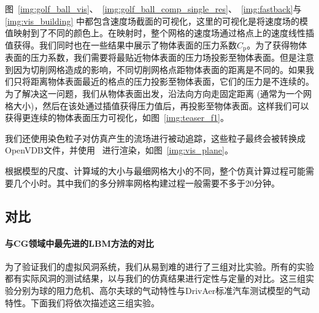 图~\ref{img:golf_ball_vis}、~\ref{img:golf_ball_comp_single_res}、~\ref{img:fastback}与\ref{img:vis_building} 中都包含速度场截面的可视化，这里的可视化是将速度场的模值映射到了不同的颜色上。在映射时，整个网格的速度场通过格点上的速度线性插值获得。我们同时也在一些结果中展示了物体表面的压力系数$C_\text{p}$。为了获得物体表面的压力系数，我们需要将最贴近物体表面的压力场投影至物体表面。但是注意到因为切削网格造成的影响，不同切削网格点距物体表面的距离是不同的。如果我们只将距离物体表面最近的格点的压力投影至物体表面，它们的压力是不连续的。为了解决这一问题，我们从物体表面出发，沿法向方向走固定距离 (通常为一个网格大小)，然后在该处通过插值获得压力值后，再投影至物体表面。这样我们可以获得更连续的物体表面压力可视化，如图~\ref{img:teaser_f1}。

我们还使用染色粒子对仿真产生的流场进行被动追踪，这些粒子最终会被转换成OpenVDB文件，并使用~\cite{redshift} 进行渲染，如图~\ref{img:vis_plane}。

根据模型的尺度、计算域的大小与最细网格大小的不同，整个仿真计算过程可能需要几个小时。其中我们的多分辨率网格构建过程一般需要不多于20分钟。

\subsection{对比}
\paragraph{与CG领域中最先进的LBM方法的对比}

为了验证我们的虚拟风洞系统，我们从易到难的进行了三组对比实验。所有的实验都有实际风洞的测试结果，以与我们的仿真结果进行定性与定量的对比。这三组实验分别为球的阻力危机、高尔夫球的气动特性与DrivAer标准汽车测试模型的气动特性。下面我们将依次描述这三组实验。

